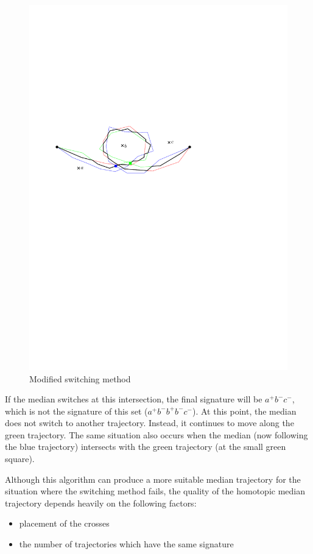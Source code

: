 \begin{figure}
\centering
\includegraphics[scale=1]{Gambar/hmtp_works}
\caption[Modified switching method \cite{Lionov:2009}]{Modified switching method \cite{Lionov:2009}} 
\label{fig:homotopy_algo}
\end{figure}

If the median switches at this intersection, the final signature will be \textit{$a^{+}b^{-}c^{-}$}, which is not the signature of this set (\textit{$a^{+}b^{-}b^{+}b^{-}c^{-}$}). 
At this point, the median does not switch to another trajectory. 
Instead, it continues to move along the green trajectory. 
The same situation also occurs when the median (now following the blue trajectory) intersects with the green trajectory (at the small green square).

Although this algorithm can produce a more suitable median trajectory for the situation where the switching method fails, the quality of the homotopic median trajectory depends heavily on the following factors:
\begin{itemize}
\item placement of the crosses
\item the number of trajectories which have the same signature 
\end{itemize}

